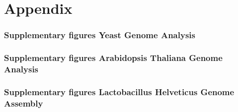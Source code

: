 \documentclass[10pt,a4paper]{article}
\begin{document}
\newpage
{}


\newpage
\appendix
\part{Appendix}
\section{Supplementary figures Yeast Genome Analysis}


\section{Supplementary figures Arabidopsis Thaliana Genome Analysis}


\section{Supplementary figures Lactobacillus Helveticus Genome Assembly}
\end{document}
